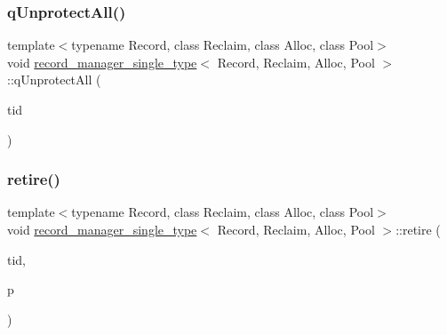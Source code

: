 \mbox{\label{classrecord__manager__single__type_a500b38bc56f5643ca679337e7adacedf}} 
\subsubsection{\texorpdfstring{q\+Unprotect\+All()}{qUnprotectAll()}}
{\footnotesize\ttfamily template$<$typename Record, class Reclaim, class Alloc, class Pool$>$ \\
void \hyperlink{classrecord__manager__single__type}{record\+\_\+manager\+\_\+single\+\_\+type}$<$ Record, Reclaim, Alloc, Pool $>$\+::q\+Unprotect\+All (\begin{DoxyParamCaption}\item[{const int}]{tid }\end{DoxyParamCaption})\hspace{0.3cm}{\ttfamily [inline]}}

\mbox{\label{classrecord__manager__single__type_a938c477e09003c663e44bd415492c62d}} 
\subsubsection{\texorpdfstring{retire()}{retire()}}
{\footnotesize\ttfamily template$<$typename Record, class Reclaim, class Alloc, class Pool$>$ \\
void \hyperlink{classrecord__manager__single__type}{record\+\_\+manager\+\_\+single\+\_\+type}$<$ Record, Reclaim, Alloc, Pool $>$\+::retire (\begin{DoxyParamCaption}\item[{const int}]{tid,  }\item[{\hyperlink{classrecord__manager__single__type_a065f05d1a84e619758122b3da04b1327}{record\+\_\+pointer}}]{p }\end{DoxyParamCaption})\hspace{0.3cm}{\ttfamily [inline]}}

